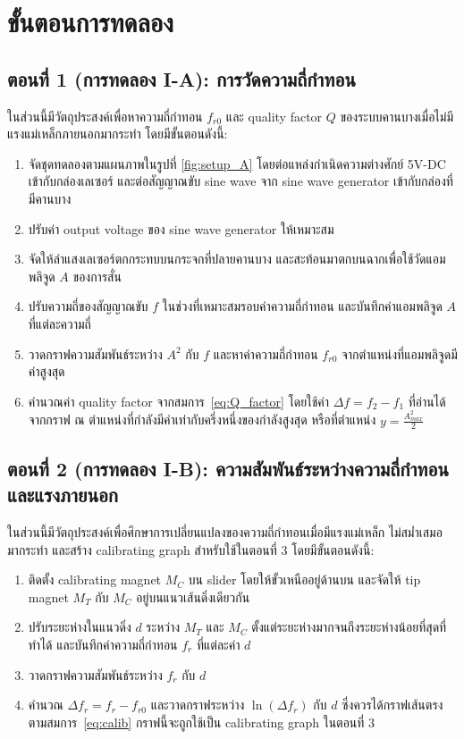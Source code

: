 \documentclass[11pt,a4paper]{article}
\begin{document}
\section{ขั้นตอนการทดลอง} \label{procedure}

\subsection*{ตอนที่ 1 (การทดลอง I-A): การวัดความถี่กำทอน}
ในส่วนนี้มีวัตถุประสงค์เพื่อหาความถี่กำทอน $f_{r0}$ และ quality factor $Q$ 
ของระบบคานบางเมื่อไม่มีแรงแม่เหล็กภายนอกมากระทำ โดยมีขั้นตอนดังนี้:
\begin{enumerate}
    \item จัดชุดทดลองตามแผนภาพในรูปที่ \ref{fig:setup_A} โดยต่อแหล่งกำเนิดความต่างศักย์ 
    5V-DC เข้ากับกล่องเลเซอร์ และต่อสัญญาณขับ sine wave จาก sine wave generator 
    เข้ากับกล่องที่มีคานบาง
    \item ปรับค่า output voltage ของ sine wave generator ให้เหมาะสม
    \item จัดให้ลำแสงเลเซอร์ตกกระทบบนกระจกที่ปลายคานบาง 
    และสะท้อนมาตกบนฉากเพื่อใช้วัดแอมพลิจูด $A$ ของการสั่น
    \item ปรับความถี่ของสัญญาณขับ $f$ ในช่วงที่เหมาะสมรอบค่าความถี่กำทอน 
    และบันทึกค่าแอมพลิจูด $A$ ที่แต่ละความถี่
    \item วาดกราฟความสัมพันธ์ระหว่าง $A^2$ กับ $f$ 
    และหาค่าความถี่กำทอน $f_{r0}$ จากตำแหน่งที่แอมพลิจูดมีค่าสูงสุด
    \item คำนวณค่า quality factor จากสมการ~\eqref{eq:Q_factor} 
    โดยใช้ค่า $\Delta f = f_2 - f_1$ ที่อ่านได้จากกราฟ 
    ณ ตำแหน่งที่กำลังมีค่าเท่ากับครึ่งหนึ่งของกำลังสูงสุด หรือที่ตำแหน่ง $y = \frac{A^2_{max}}{2}$
\end{enumerate}

\subsection*{ตอนที่ 2 (การทดลอง I-B): ความสัมพันธ์ระหว่างความถี่กำทอนและแรงภายนอก}
ในส่วนนี้มีวัตถุประสงค์เพื่อศึกษาการเปลี่ยนแปลงของความถี่กำทอนเมื่อมีแรงแม่เหล็ก
ไม่สม่ำเสมอมากระทำ และสร้าง calibrating graph สำหรับใช้ในตอนที่ 3 
โดยมีขั้นตอนดังนี้:
\begin{enumerate}
    \item ติดตั้ง calibrating magnet $M_C$ บน slider โดยให้ขั้วเหนืออยู่ด้านบน 
    และจัดให้ tip magnet $M_T$ กับ $M_C$ อยู่บนแนวเส้นดิ่งเดียวกัน
    \item ปรับระยะห่างในแนวดิ่ง $d$ ระหว่าง $M_T$ และ $M_C$ 
    ตั้งแต่ระยะห่างมากจนถึงระยะห่างน้อยที่สุดที่ทำได้ 
    และบันทึกค่าความถี่กำทอน $f_r$ ที่แต่ละค่า $d$
    \item วาดกราฟความสัมพันธ์ระหว่าง $f_r$ กับ $d$
    \item คำนวณ $\Delta f_r = f_r - f_{r0}$ 
    และวาดกราฟระหว่าง $\ln(\Delta f_r)$ กับ $d$ 
    ซึ่งควรได้กราฟเส้นตรงตามสมการ~\eqref{eq:calib} 
    กราฟนี้จะถูกใช้เป็น calibrating graph ในตอนที่ 3
\end{enumerate}
\end{document}
